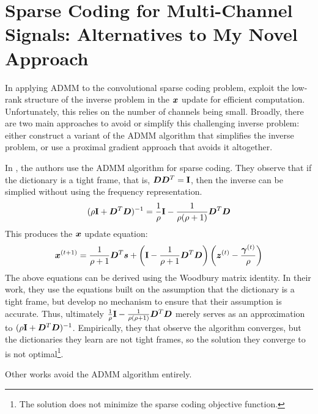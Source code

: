 \section{Sparse Coding for Multi-Channel Signals: Alternatives to My Novel Approach}
In applying ADMM to the convolutional sparse coding problem, \cite{vsorel2016fast} \cite{heide2015fast} \cite{wohlberg2015efficient} exploit the low-rank structure of the inverse problem in the $\bm{x}$ update for efficient computation. Unfortunately, this relies on the number of channels being small. Broadly, there are two main approaches to avoid or simplify this challenging inverse problem: either construct a variant of the ADMM algorithm that simplifies the inverse problem, or use a proximal gradient approach that avoids it altogether.

In \cite{chodosh2018deep}\cite{murdock2018deep}, the authors use the ADMM algorithm for sparse coding. They observe that if the dictionary is a tight frame, that is, $\bm{D}\bm{D}^T = {\bf I}$, then the inverse can be simplied without using the frequency representation.
%
\begin{equation}
(\rho{\bf I} + \bm{D}^T\bm{D})^{-1} = \frac{1}{\rho}{\bf I} - \frac{1}{\rho(\rho + 1)}\bm{D}^T\bm{D}
\end{equation}
%
This produces the $\bm{x}$ update equation:
%
\begin{equation}
\bm{x}^{(t + 1)} = \frac{1}{\rho + 1}\bm{D}^T\bm{s} + \left({\bf I} - \frac{1}{\rho + 1}\bm{D}^T\bm{D}\right)\left(\bm{z}^{(t)} - \frac{\bm{\gamma}^{(t)}}{\rho}\right)
\end{equation}
%
The above equations can be derived using the Woodbury matrix identity. In their work, they use the equations built on the assumption that the dictionary is a tight frame, but develop no mechanism to ensure that their assumption is accurate. Thus, ultimately $\frac{1}{\rho}{\bf I} - \frac{1}{\rho(\rho + 1)}\bm{D}^T\bm{D}$ merely serves as an approximation to $(\rho{\bf I} + \bm{D}^T\bm{D})^{-1}$. Empirically, they that observe the algorithm converges, but the dictionaries they learn are not tight frames, so the solution they converge to is not optimal\footnote{The solution does not minimize the sparse coding objective function.}.

Other works avoid the ADMM algorithm entirely.


